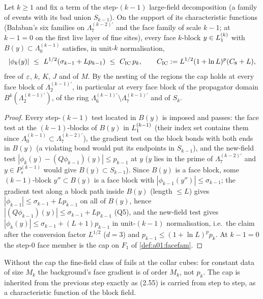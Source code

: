 \begin{lemma}\label{lem:a01:IC}
Let $k\ge1$ and fix a term of the step-$(k-1)$ large-field decomposition (a family of events with its bad union $S_{k-1}$). On the support of its characteristic functions (Ba{\l}aban's six families on $\Lambda_7^{(k-2)\prime}$ and the face family of scale $k-1$; at $k-1=0$ on the first live layer of fine sites), every face $k$-block $y\in L_{1}^{(k)}$ with $B(y)\subset\Lambda_0^{(k-1)}$ satisfies, in unit-$k$ normalisation,
\[
|\phi_k(y)|\ \le\ L^{1/2}(\sigma_{k-1}+Lp_{k-1})\ \le\ C_{\mathrm{IC}}\,p_k,\qquad C_{\mathrm{IC}}\defeq L^{1/2}(1+\ln L)^p(C_8+L),
\]
free of $\varepsilon$, $k$, $K$, $J$ and of $M$. By the nesting of the regions the cap holds at every face block of $\Lambda_2^{(k-1)\prime}$, in particular at every face block of the propagator domain $B^k(\Lambda_2^{(k-1)\prime})$, of the ring $\Lambda_6^{(k-1)\prime}\setminus\Lambda_7^{(k-1)\prime}$ and of $S_k$.
\end{lemma}
\begin{proof}
Every step-$(k-1)$ test located in $B(y)$ is imposed and passes: the face test at the $(k-1)$-blocks of $B(y)$ in $L_{1}^{(k-1)}$ (their index set contains them since $\Lambda_0^{(k-1)}\subset\Lambda_7^{(k-2)\prime}$), the gradient test on the block bonds with both ends in $B(y)$ (a violating bond would put its endpoints in $S_{k-1}$), and the new-field test $|\phi_k(y)-(Q\phi_{k-1})(y)|\le p_{k-1}$ at $y$ ($y$ lies in the prime of $\Lambda_7^{(k-2)\prime}$ and $y\in P_s^{(k-1)}$ would give $B(y)\subset S_{k-1}$). Since $B(y)$ is a face block, some $(k-1)$-block $y''\subset B(y)$ is a face block with $|\phi_{k-1}(y'')|\le\sigma_{k-1}$; the gradient test along a block path inside $B(y)$ (length $\le L$) gives $|\phi_{k-1}|\le\sigma_{k-1}+Lp_{k-1}$ on all of $B(y)$, hence $|(Q\phi_{k-1})(y)|\le\sigma_{k-1}+Lp_{k-1}$ (Q5), and the new-field test gives $|\phi_k(y)|\le\sigma_{k-1}+(L+1)p_{k-1}$ in unit-$(k-1)$ normalisation, i.e.\ the claim after the conversion factor $L^{1/2}$ ($d=3$) and $p_{k-1}\le(1+\ln L)^pp_k$. At $k-1=0$ the step-$0$ face member is the cap on $F_1$ of \cref{def:a01:facefam}.
\end{proof}

Without the cap the fine-field class of \cite[(2.55)]{Ba2} fails at the collar cubes: for constant data of size $M_k$ the background's face gradient is of order $M_k$, not $p_k$. The cap is inherited from the previous step exactly as (2.55) is carried from step to step, as a characteristic function of the block field.
